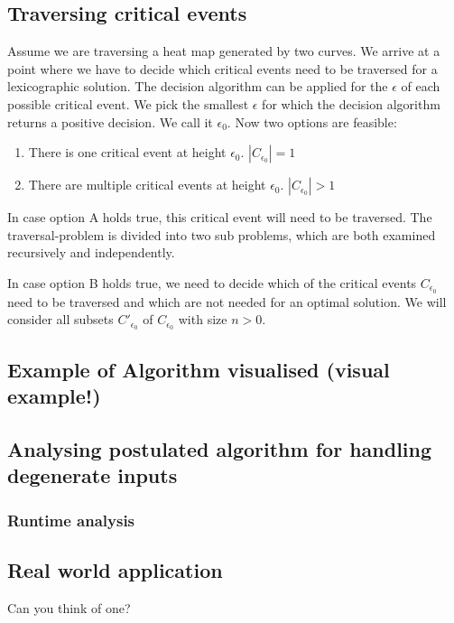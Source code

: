 \subsection{Traversing critical events}

Assume we are traversing a heat map generated by two curves. We arrive at a point where we have to decide which critical events need to be traversed for a lexicographic solution. The decision algorithm\cite{altgodau} can be applied for the $\epsilon$ of each possible critical event. We pick the smallest $\epsilon$ for which the decision algorithm returns a positive decision. We call it $\epsilon_0$. Now two options are feasible:

\begin{enumerate}[label=(\Alph*)]
	\item There is one critical event at height $\epsilon_0$. $|C_{\epsilon_0}| = 1$
	\item There are multiple critical events at height $\epsilon_0$. $|C_{\epsilon_0}| > 1$
\end{enumerate}

In case option A holds true, this critical event will need to be traversed. The traversal-problem is divided into two sub problems, which are both examined recursively and independently.

In case option B holds true, we need to decide which of the critical events $C_{\epsilon_0}$ need to be traversed and which are not needed for an optimal solution. We will consider all subsets $C'_{\epsilon_0}$ of $C_{\epsilon_0}$ with size $n>0$.


\subsection{Example of Algorithm visualised (visual example!)}

\subsection{Analysing postulated algorithm for handling degenerate inputs}
\subsubsection{Runtime analysis}
\subsection{Real world application}
	Can you think of one?
	
	
	
